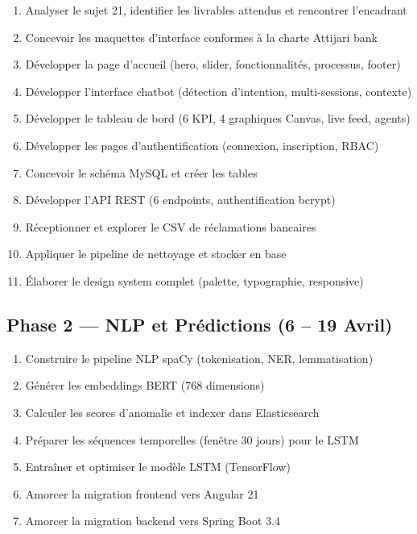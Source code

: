 \documentclass[12pt,a4paper]{report}
\begin{document}
\begin{enumerate}[noitemsep]
    \item Analyser le sujet 21, identifier les livrables attendus et rencontrer l'encadrant
    \item Concevoir les maquettes d'interface conformes à la charte Attijari bank
    \item Développer la page d'accueil (hero, slider, fonctionnalités, processus, footer)
    \item Développer l'interface chatbot (détection d'intention, multi-sessions, contexte)
    \item Développer le tableau de bord (6 KPI, 4 graphiques Canvas, live feed, agents)
    \item Développer les pages d'authentification (connexion, inscription, RBAC)
    \item Concevoir le schéma MySQL et créer les tables
    \item Développer l'API REST (6 endpoints, authentification bcrypt)
    \item Réceptionner et explorer le CSV de réclamations bancaires
    \item Appliquer le pipeline de nettoyage et stocker en base
    \item Élaborer le design system complet (palette, typographie, responsive)
\end{enumerate}

\subsection{Phase 2 --- NLP et Prédictions (6 -- 19 Avril)}

\begin{enumerate}[noitemsep, start=12]
    \item Construire le pipeline NLP spaCy (tokenisation, NER, lemmatisation)
    \item Générer les embeddings BERT (768 dimensions)
    \item Calculer les scores d'anomalie et indexer dans Elasticsearch
    \item Préparer les séquences temporelles (fenêtre 30 jours) pour le LSTM
    \item Entraîner et optimiser le modèle LSTM (TensorFlow)
    \item Amorcer la migration frontend vers Angular 21
    \item Amorcer la migration backend vers Spring Boot 3.4
\end{enumerate}
\end{document}
